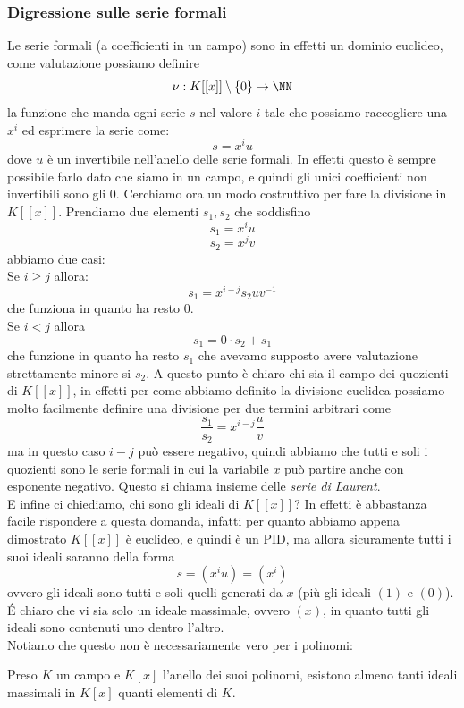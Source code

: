 \documentclass[11pt]{scrartcl}
\begin{document}
	\subsubsection{Digressione sulle serie formali}
	Le serie formali (a coefficienti in un campo) sono in effetti un dominio euclideo, come valutazione possiamo definire 
	$$\nu:K[[x]]\setminus\left\{0\right\}\to\NN$$
	la funzione che manda ogni serie $s$ nel valore $i$ tale che possiamo raccogliere una $x^i$ ed esprimere la serie come:
	$$s=x^iu$$
	dove $u$ è un invertibile nell'anello delle serie formali. In effetti questo è sempre possibile farlo dato che siamo in un campo, e quindi gli unici coefficienti non invertibili sono gli $0$. Cerchiamo ora un modo costruttivo per fare la divisione in $K[[x]]$. Prendiamo due elementi $s_1,s_2$ che soddisfino
	$$s_1=x^iu$$
	$$s_2=x^jv$$ 
	abbiamo due casi: \\
	Se $i\ge j$ allora:
	$$s_1=x^{i-j}s_2uv^{-1}$$
	che funziona in quanto ha resto $0$.\\
	Se $i<j$ allora
	$$s_1=0\cdot s_2+s_1$$
	che funzione in quanto ha resto $s_1$ che avevamo supposto avere valutazione strettamente minore si $s_2$. 
	A questo punto è chiaro chi sia il campo dei quozienti di $K[[x]]$, in effetti per come abbiamo definito la divisione euclidea possiamo molto facilmente definire una divisione per due termini arbitrari come
	$$\frac{s_1}{s_2}=x^{i-j}\frac{u}{v}$$
	ma in questo caso $i-j$ può essere negativo, quindi abbiamo che tutti e soli i quozienti sono le serie formali in cui la variabile $x$ può partire anche con esponente negativo. Questo si chiama insieme delle \textit{serie di Laurent}. \\
	E infine ci chiediamo, chi sono gli ideali di $K[[x]]$? In effetti è abbastanza facile rispondere a questa domanda, infatti per quanto abbiamo appena dimostrato $K[[x]]$ è euclideo, e quindi è un PID, ma allora sicuramente tutti i suoi ideali saranno della forma 
	$$s=(x^iu)=(x^i)$$
	ovvero gli ideali sono tutti e soli quelli generati da $x$ (più gli ideali $(1)$ e $(0)$). \'E chiaro che vi sia solo un ideale massimale, ovvero $(x)$, in quanto tutti gli ideali sono contenuti uno dentro l'altro. \\
	Notiamo che questo non è necessariamente vero per i polinomi:
	\begin{proposition}
		Preso $K$ un campo e $K[x]$ l'anello dei suoi polinomi, esistono almeno tanti ideali massimali in $K[x]$ quanti elementi di $K$.
	\end{proposition}
\end{document}
